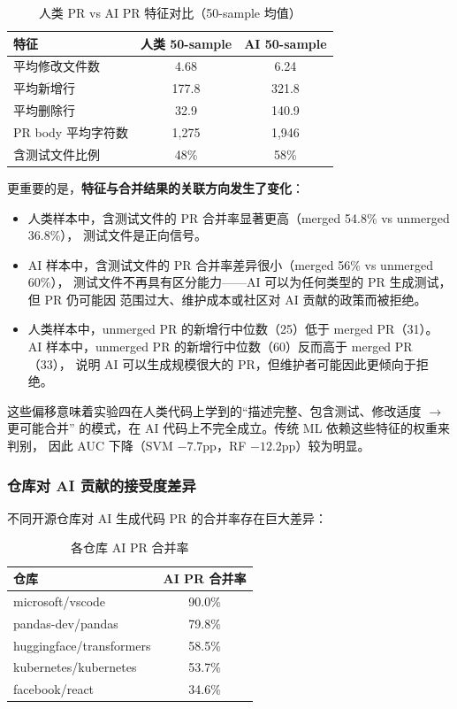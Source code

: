 \documentclass{experimentreport}
\begin{document}
\begin{table}[htbp]
\centering
\caption{人类 PR vs AI PR 特征对比（50-sample 均值）}
\begin{tabular}{lcc}
\toprule
特征 & 人类 50-sample & AI 50-sample \\
\midrule
平均修改文件数 & 4.68 & 6.24 \\
平均新增行 & 177.8 & 321.8 \\
平均删除行 & 32.9 & 140.9 \\
PR body 平均字符数 & 1,275 & 1,946 \\
含测试文件比例 & 48\% & 58\% \\
\bottomrule
\end{tabular}
\end{table}

更重要的是，\textbf{特征与合并结果的关联方向发生了变化}：
\begin{itemize}
    \item 人类样本中，含测试文件的 PR 合并率显著更高（merged 54.8\% vs unmerged 36.8\%），
          测试文件是正向信号。
    \item AI 样本中，含测试文件的 PR 合并率差异很小（merged 56\% vs unmerged 60\%），
          测试文件不再具有区分能力——AI 可以为任何类型的 PR 生成测试，但 PR 仍可能因
          范围过大、维护成本或社区对 AI 贡献的政策而被拒绝。
    \item 人类样本中，unmerged PR 的新增行中位数（25）低于 merged PR（31）。
          AI 样本中，unmerged PR 的新增行中位数（60）反而高于 merged PR（33），
          说明 AI 可以生成规模很大的 PR，但维护者可能因此更倾向于拒绝。
\end{itemize}

这些偏移意味着实验四在人类代码上学到的“描述完整、包含测试、修改适度 $\rightarrow$ 更可能合并”
的模式，在 AI 代码上不完全成立。传统 ML 依赖这些特征的权重来判别，
因此 AUC 下降（SVM $-7.7$pp，RF $-12.2$pp）较为明显。

\subsubsection{仓库对 AI 贡献的接受度差异}

不同开源仓库对 AI 生成代码 PR 的合并率存在巨大差异：

\begin{table}[htbp]
\centering
\caption{各仓库 AI PR 合并率}
\begin{tabular}{lc}
\toprule
仓库 & AI PR 合并率 \\
\midrule
microsoft/vscode & 90.0\% \\
pandas-dev/pandas & 79.8\% \\
huggingface/transformers & 58.5\% \\
kubernetes/kubernetes & 53.7\% \\
facebook/react & 34.6\% \\
\bottomrule
\end{tabular}
\end{table}
\end{document}
